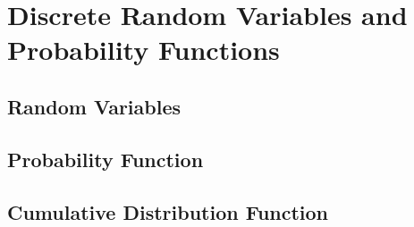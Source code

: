\chapter{Discrete Random Variables and Probability Functions}
\section{Random Variables}
\lipsum[2]
\section{Probability Function}
\lipsum[1]
\section{Cumulative Distribution Function}
\lipsum[3]
